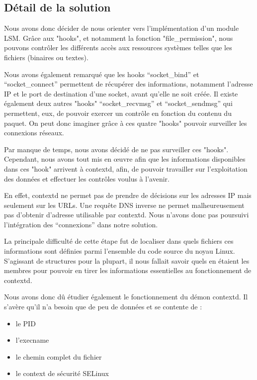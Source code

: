 \documentclass[pdftex,a4paper,titlepage,11pt]{article}
\begin{document}
\subsection{Détail de la solution}

Nous avons donc décider de nous orienter vers l'implémentation d'un module LSM. Grâce aux "hooks", et notamment la fonction "file\_permission", nous pouvons contrôler les différents accès aux ressources systèmes telles que les fichiers (binaires ou textes).

Nous avons également remarqué que les hooks ``socket\_bind'' et ``socket\_connect'' permettent de récupérer des informations, notamment l'adresse IP et le port de destination d'une socket, avant qu'elle ne soit créée. Il existe également deux autres "hooks" ``socket\_recvmsg'' et ``socket\_sendmsg'' qui permettent, eux, de pouvoir exercer un contrôle en fonction du contenu du paquet. On peut donc imaginer grâce à ces quatre "hooks" pouvoir surveiller les connexions réseaux.

Par manque de temps, nous avons décidé de ne pas surveiller ces "hooks". Cependant, nous avons tout mis en œuvre afin que les informations disponibles dans ces "hook" arrivent à contextd, afin, de pouvoir travailler sur l'exploitation des données et effectuer les contrôles voulus à l'avenir.

En effet, contextd ne permet pas de prendre de décisions sur les adresses IP mais seulement sur les URLs. Une requête DNS inverse ne permet malheureusement pas d'obtenir d'adresse utilisable par contextd. Nous n'avons donc pas poursuivi l'intégration des ``connexions'' dans notre solution.

La principale difficulté de cette étape fut de localiser dans quels fichiers ces informations sont définies parmi l'ensemble du code source du noyau Linux. S'agissant de structures pour la plupart, il nous fallait savoir quels en étaient les membres pour pouvoir en tirer les informations essentielles au fonctionnement de contextd.

Nous avons donc dû étudier également le fonctionnement du démon contextd. Il s'avère qu'il n'a besoin que de peu de données et se contente de :
	\begin{itemize}
		\item le PID
		\item l'execname
		\item le chemin complet du fichier
		\item le context de sécurité SELinux~\\
	\end{itemize}
	
\end{document}
